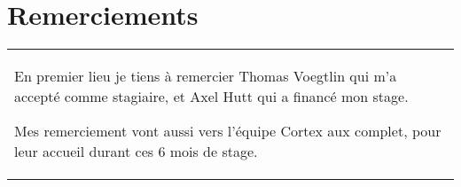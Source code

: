 \chapter*{Remerciements}
\thispagestyle{empty}
\begin{flushleft}
  \begin{tabularx}{14cm}{X}
     En premier lieu je tiens à remercier Thomas Voegtlin qui m'a accepté
     comme stagiaire, et Axel Hutt qui a financé mon stage.

     Mes remerciement vont aussi vers l'équipe Cortex aux complet, pour leur
     accueil durant ces 6 mois de stage.
  \end{tabularx}
\end{flushleft}
